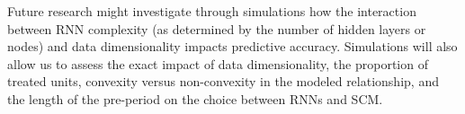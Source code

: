 \documentclass[hidelinks,12pt]{article}
\begin{document}
Future research might investigate through simulations how the interaction between RNN complexity (as determined by the number of hidden layers or nodes) and data dimensionality impacts predictive accuracy. Simulations will also allow us to assess the exact impact of data dimensionality, the proportion of treated units, convexity versus non-convexity in the modeled relationship, and the length of the pre-period on the choice between RNNs and SCM. %

\newpage


\begin{singlespace}
	\begin{footnotesize}
		\begin{multicols}{2}
			
		\end{multicols}
	\end{footnotesize}
\end{singlespace}

\itemize
\end{document}
